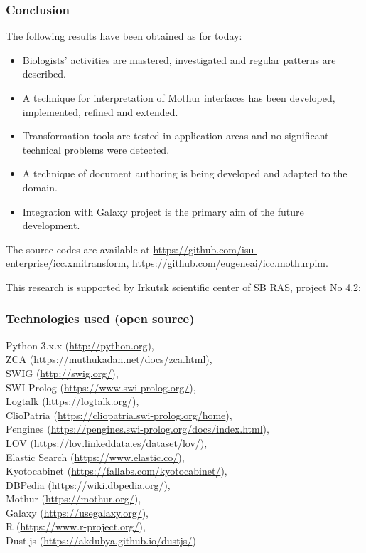 \documentclass[10pt]{beamer}
\begin{document}
\begin{frame}
  \frametitle{Conclusion}
  The following results have been obtained as for today:
  \begin{itemize}
  \item Biologists' activities are mastered, investigated and regular patterns are described.
  \item A technique for interpretation of Mothur interfaces has been developed, implemented, refined and extended.
  \item Transformation tools are tested in application areas and no significant technical problems were detected.
  \item A technique of document authoring is being developed and adapted to the domain.
  \item Integration with Galaxy project is the primary aim of the future development.
  \end{itemize}
  The source codes are available at \url{https://github.com/isu-enterprise/icc.xmitransform}, \url{https://github.com/eugeneai/icc.mothurpim}.

  This research is supported by Irkutsk scientific center of SB RAS, project No 4.2;
\end{frame}

\begin{frame}
  \frametitle{Technologies used (open source)}
  Python-3.x.x (\url{http://python.org}),\\
  ZCA (\url{https://muthukadan.net/docs/zca.html}),\\
  SWIG (\url{http://swig.org/}),\\
  SWI-Prolog (\url{https://www.swi-prolog.org/}),\\
  Logtalk (\url{https://logtalk.org/}),\\
  ClioPatria (\url{https://cliopatria.swi-prolog.org/home}),\\
  Pengines (\url{https://pengines.swi-prolog.org/docs/index.html}),\\
  LOV (\url{https://lov.linkeddata.es/dataset/lov/}),\\
  Elastic Search (\url{https://www.elastic.co/}),\\
  Kyotocabinet (\url{https://fallabs.com/kyotocabinet/}),\\
  DBPedia (\url{https://wiki.dbpedia.org/}),\\
  Mothur (\url{https://mothur.org/}),\\
  Galaxy (\url{https://usegalaxy.org/}),\\
  R (\url{https://www.r-project.org/}), \\
  Dust.js (\url{https://akdubya.github.io/dustjs/})
\end{frame}
\end{document}
